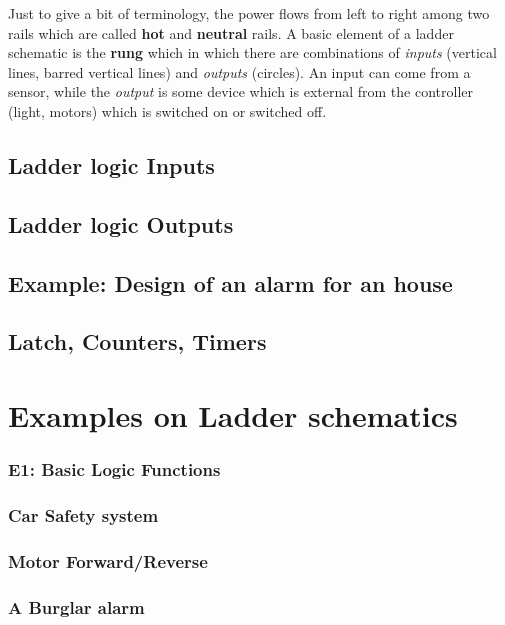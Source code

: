 Just to give a bit of terminology, the power flows from left to  right among two rails which are called \textbf{hot} and \textbf{neutral} rails. A basic element of a ladder schematic is the \textbf{rung} which in which there are combinations of \textit{inputs} (vertical lines, barred vertical lines) and \textit{outputs} (circles). An input can come from a sensor, while the \textit{output} is some device which is external from the controller (light, motors) which is switched on or switched off.

\subsection{Ladder logic Inputs}

\subsection{Ladder logic Outputs}

\subsection{Example: Design of an alarm for an house}

\subsection{Latch, Counters, Timers}

\section{Examples on Ladder schematics}

\subsubsection{E1: Basic Logic Functions}

\subsubsection{Car Safety system}

\subsubsection{Motor Forward/Reverse}

\subsubsection{A Burglar alarm}


